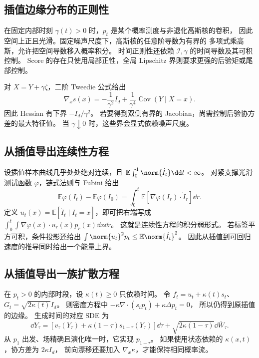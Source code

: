 \subsection{插值边缘分布的正则性}

在固定内部时刻 \(\gamma(t)>0\) 时，\(p_t\) 是某个概率测度与非退化高斯核的卷积，
因此空间上正且光滑。固定噪声尺度下，高斯核的任意阶导数为有界的
多项式乘高斯，允许把空间导数移入概率积分。
时间正则性还依赖 \(\mathcal I,\gamma\) 的时间导数及其可积控制。
Score 的存在只使用局部正性，全局 Lipschitz 界则要求更强的后验矩或尾部控制。

对 \(X=Y+\gamma\zeta\)，二阶 Tweedie 公式给出
\begin{equation}
 \nabla_xs(x)=-\frac1{\gamma^2}I_d
                 +\frac1{\gamma^4}\operatorname{Cov}(Y\mid X=x).
 \label{eq:unified-score-hessian}
\end{equation}
因此 Hessian 有下界 \(-I_d/\gamma^2\)。
若要得到双侧有界的 Jacobian，尚需控制后验协方差的最大特征值。
当 \(\gamma\downarrow0\) 时，这些界会显式依赖噪声尺度。

\subsection{从插值导出连续性方程}

设插值样本曲线几乎处处绝对连续，且 \(\mathbb E\int_0^1\norm{\dot I_t}\dd t<\infty\)。
对紧支撑光滑测试函数 \(\varphi\)，链式法则与 Fubini 给出
\[
 \mathbb E\varphi(I_t)-\mathbb E\varphi(I_0)
 =\int_0^t\mathbb E[\nabla\varphi(I_r)\cdot\dot I_r]\dd r.
\]
定义 \(u_t(x)=\mathbb E[\dot I_t\mid I_t=x]\)，即可把右端写成
\(\int_0^t\int\nabla\varphi(x)\cdot u_r(x)p_r(x)\dd x\dd r\)。
这就是连续性方程的积分弱形式。
若标签平方可积，条件投影还给出
\(\int\norm{u_t}^2p_t\le\mathbb E\norm{\dot I_t}^2\)。
因此从插值到可回归速度的推导同时给出一个能量上界。

\subsection{从插值导出一族扩散方程}

在 \(p_t>0\) 的内部时段，设 \(\kappa(t)\ge0\) 只依赖时间。
令 \(f_t=u_t+\kappa(t)s_t\)、\(G_t=\sqrt{2\kappa(t)}I_d\)。
则密度方程中
\(-\kappa\nabla\cdot(s_tp_t)+\kappa\Delta p_t=0\)，
所以仍得到原插值的边缘。
生成时间的对应 SDE 为
\begin{equation}
 \dd Y_\tau=[v_\tau(Y_\tau)+\kappa(1-\tau)s_{1-\tau}(Y_\tau)]\dd\tau
                  +\sqrt{2\kappa(1-\tau)}\dd\overline W_\tau.
 \label{eq:unified-interpolant-sde}
\end{equation}
从 \(p_1\) 出发、场精确且演化唯一时，它实现 \(p_{1-\tau}\)。
如果使用状态依赖的 \(\kappa(x,t)\)，协方差为 \(2\kappa I_d\)，
前向漂移还要加入 \(\nabla_x\kappa\)，才能保持相同概率流。

